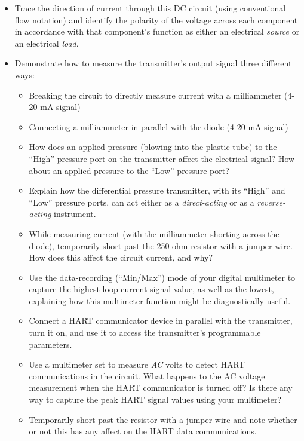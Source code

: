 \begin{itemize}
\item{} Trace the direction of current through this DC circuit (using conventional flow notation) and identify the polarity of the voltage across each component in accordance with that component's function as either an electrical {\it source} or an electrical {\it load}.
\vskip 10pt
\item{} Demonstrate how to measure the transmitter's output signal three different ways:
\begin{itemize}

\item{} Breaking the circuit to directly measure current with a milliammeter (4-20 mA signal)
\item{} Connecting a milliammeter in parallel with the diode (4-20 mA signal)
\vskip 10pt
\item{} How does an applied pressure (blowing into the plastic tube) to the ``High'' pressure port on the transmitter affect the electrical signal?  How about an applied pressure to the ``Low'' pressure port?
\vskip 10pt
\item{} Explain how the differential pressure transmitter, with its ``High'' and ``Low'' pressure ports, can act either as a {\it direct-acting} or as a {\it reverse-acting} instrument.
\vskip 10pt
\item{} While measuring current (with the milliammeter shorting across the diode), temporarily short past the 250 ohm resistor with a jumper wire.  How does this affect the circuit current, and why?
\vskip 10pt
\item{} Use the data-recording (``Min/Max'') mode of your digital multimeter to capture the highest loop current signal value, as well as the lowest, explaining how this multimeter function might be diagnostically useful.
\vskip 10pt
\item{} Connect a HART communicator device in parallel with the transmitter, turn it on, and use it to access the transmitter's programmable parameters.
\vskip 10pt
\item{} Use a multimeter set to measure {\it AC} volts to detect HART communications in the circuit.  What happens to the AC voltage measurement when the HART communicator is turned off?  Is there any way to capture the peak HART signal values using your multimeter?
\vskip 10pt
\item{} Temporarily short past the resistor with a jumper wire and note whether or not this has any affect on the HART data communications.
\end{itemize}


\end{itemize}
